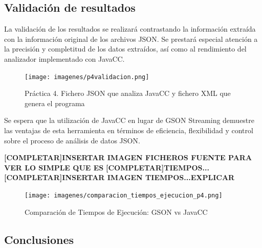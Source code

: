 \subsection{Validación de resultados}

La validación de los resultados se realizará contrastando la información extraída con la información original de los archivos JSON. Se prestará especial atención a la precisión y completitud de los datos extraídos, así como al rendimiento del analizador implementado con JavaCC.



\begin{figure}[H]
	\centering
	\texttt{[image: imagenes/p4validacion.png]}
	\caption{\label{fig:p4xmlvalidacion2}Práctica 4. Fichero JSON que analiza JavaCC y fichero XML que genera el programa}
\end{figure}



Se espera que la utilización de JavaCC en lugar de GSON Streaming demuestre las ventajas de esta herramienta en términos de eficiencia, flexibilidad y control sobre el proceso de análisis de datos JSON.

\textbf{[COMPLETAR]INSERTAR IMAGEN FICHEROS FUENTE PARA VER LO SIMPLE QUE ES
}
\textbf{[COMPLETAR]TIEMPOS...}
\textbf{[COMPLETAR]INSERTAR IMAGEN TIEMPOS...EXPLICAR}

\begin{figure}[H]
	\centering
	\texttt{[image: imagenes/comparacion\_tiempos\_ejecucion\_p4.png]}
	\caption{\label{fig:comparacion_tiempos_ejecucion_p4}Comparación de Tiempos de Ejecución: GSON vs JavaCC}
\end{figure}


\subsection{Conclusiones}

